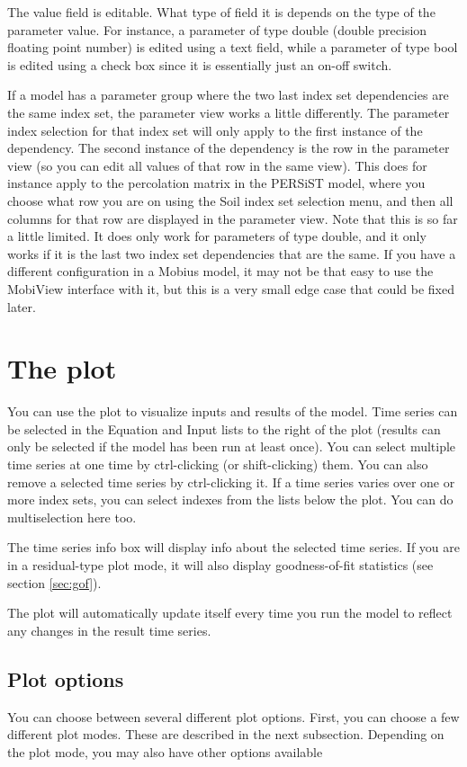 \documentclass[11pt]{article}
\theoremstyle{definition}
\begin{document}
The value field is editable. What type of field it is depends on the type of the parameter value. For instance, a parameter of type double (double precision floating point number) is edited using a text field, while a parameter of type bool is edited using a check box since it is essentially just an on-off switch.

If a model has a parameter group where the two last index set dependencies are the same index set, the parameter view works a little differently. The parameter index selection for that index set will only apply to the first instance of the dependency. The second instance of the dependency is the row in the parameter view (so you can edit all values of that row in the same view). This does for instance apply to the percolation matrix in the PERSiST model, where you choose what row you are on using the Soil index set selection menu, and then all columns for that row are displayed in the parameter view. Note that this is so far a little limited. It does only work for parameters of type double, and it only works if it is the last two index set dependencies that are the same. If you have a different configuration in a Mobius model, it may not be that easy to use the MobiView interface with it, but this is a very small edge case that could be fixed later.

\section{The plot}

You can use the plot to visualize inputs and results of the model. Time series can be selected in the Equation and Input lists to the right of the plot (results can only be selected if the model has been run at least once). You can select multiple time series at one time by ctrl-clicking (or shift-clicking) them. You can also remove a selected time series by ctrl-clicking it. If a time series varies over one or more index sets, you can select indexes from the lists below the plot. You can do multiselection here too.

The time series info box will display info about the selected time series. If you are in a residual-type plot mode, it will also display goodness-of-fit statistics (see section \ref{sec:gof}).

The plot will automatically update itself every time you run the model to reflect any changes in the result time series.

\subsection{Plot options}
You can choose between several different plot options. First, you can choose a few different plot modes. These are described in the next subsection. Depending on the plot mode, you may also have other options available
\end{document}
